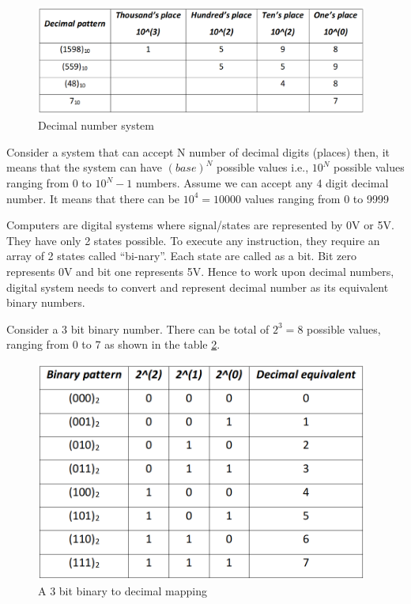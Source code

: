 \begin{figure}
    \centering
    \includegraphics[width=4.3in]{Tables/DTMF/decimal_system.png}
    \caption[Decimal Number system]{Decimal number system}
    \label{fig:decimal}
\end{figure}

\par Consider a system that can accept N number of decimal digits (places) then, it means that the system can have $(base)^N$ possible values i.e., $10^N$ possible values ranging from 0 to $10^N - 1$ numbers. Assume we can accept any 4 digit decimal number. It means that there can be $10^4 = 10000$ values ranging from 0 to 9999 

\par Computers are digital systems where signal/states are represented by 0V or 5V. They have only 2 states possible. To execute any instruction, they require an array of 2 states called “bi-nary”. Each state are called as a bit. Bit zero represents 0V and bit one represents 5V. Hence to work upon decimal numbers, digital system needs to convert and represent decimal number as its equivalent binary numbers.

\par Consider a 3 bit binary number. There can be total of $2^3 = 8$ possible values, ranging from 0 to 7 as shown in the table \ref{fig:binary}.

\begin{figure}
    \centering
    \includegraphics[width=4.3in]{Tables/DTMF/binary_system.png}
    \caption[Binary system]{A 3 bit binary to decimal mapping}
    \label{fig:binary}
\end{figure}

